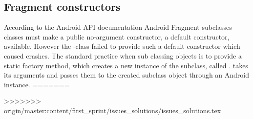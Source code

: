 \subsection{Fragment constructors}

According to the Android API documentation  Android Fragment subclasses classes must make a public no-argument constructor, a default constructor, available. However the \giraf-class  failed to provide such a default constructor which caused crashes. The standard practice when sub classing  objects is to provide a static factory method, which creates a new instance of the  subclass, called .  takes its arguments and passes them to the created  subclass object through an Android  instance. 
=======

>>>>>>> origin/master:content/first_sprint/issues_solutions/issues_solutions.tex
